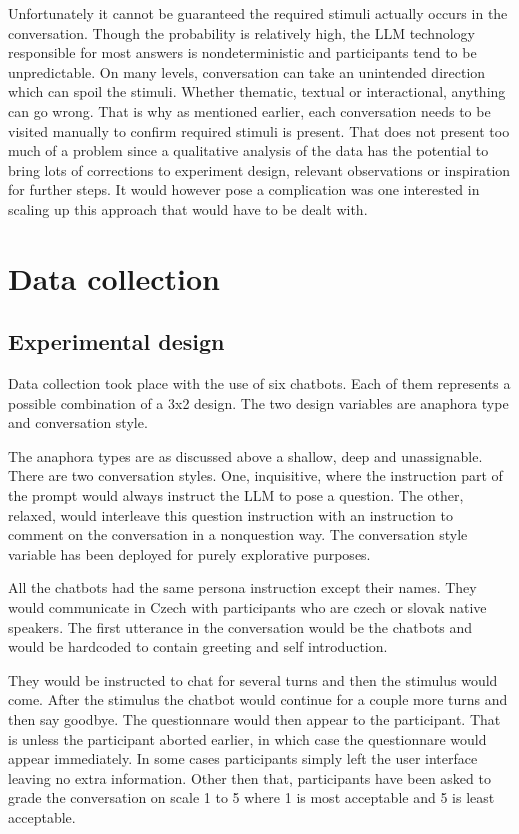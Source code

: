 \documentclass[12pt]{report}
\begin{document}
{Unfortunately it cannot be guaranteed
the required stimuli actually occurs in the conversation.
Though the probability is relatively high,
the LLM technology responsible for most answers
is nondeterministic
and participants tend to be unpredictable.
On many levels, conversation can take an unintended direction
which can spoil the stimuli.
Whether thematic, textual or interactional,
anything can go wrong.
That is why as mentioned earlier,
each conversation needs to be visited manually
to confirm required stimuli is present.
That does not present too much of a problem
since a qualitative analysis of the data
has the potential to bring lots of
corrections to experiment design,
relevant observations or
inspiration for further steps.
It would however pose a complication
was one interested in scaling up this approach
that would have to be dealt with.

\section{Data collection}

\subsection{Experimental design}

Data collection took place with the use of six chatbots.
Each of them represents a possible combination of a 3x2 design.
The two design variables are anaphora type and conversation style.

The anaphora types are as discussed above a shallow, deep and unassignable.
There are two conversation styles. One, inquisitive,
where the instruction part of the prompt
would always instruct the LLM to pose a question.
The other, relaxed, would interleave this question instruction with
an instruction to comment on the conversation in a nonquestion way.
The conversation style variable has been deployed for purely explorative purposes.

All the chatbots had the same persona instruction except their names.
They would communicate in Czech with participants who are czech or slovak native speakers.
The first utterance in the conversation would be the chatbots and
would be hardcoded to contain greeting and self introduction.

They would be instructed to chat for several turns and then the stimulus would come.
After the stimulus the chatbot would continue for a couple more turns and then say goodbye.
The questionnare would then appear to the participant.
That is unless the participant aborted earlier, in which case the questionnare would appear immediately.
In some cases participants simply left the user interface leaving no extra information.
Other then that, participants have been asked to grade the conversation on scale 1 to 5
where 1 is most acceptable and 5 is least acceptable.

}
\end{document}
